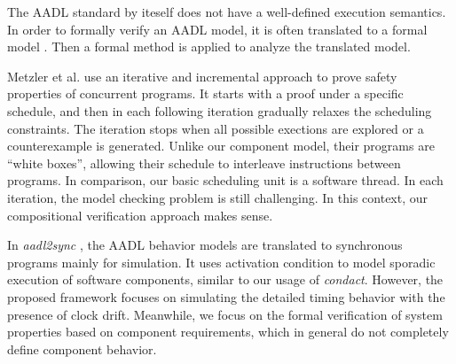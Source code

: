 The AADL standard by iteself does not have a well-defined execution semantics. In order to formally verify an AADL model, it is often translated to a formal model \cite{AADL2TASM} \cite{AADL2Sync} \cite{AADL2TLA} \cite{AADS} \cite{AADL2BIP}. Then a formal method is applied to analyze the translated model.

Metzler et al. \cite{Metzler2020} use an iterative and incremental approach to prove safety properties of concurrent programs. It starts with a proof under a specific schedule, and then in each following iteration gradually relaxes the scheduling constraints. The iteration stops when all possible exections are explored or a counterexample is generated. Unlike our component model, their programs are ``white boxes'', allowing their schedule to interleave instructions between programs. In comparison, our basic scheduling unit is a software thread. In each iteration, the model checking problem is still challenging. In this context, our compositional verification approach makes sense.

In \emph{aadl2sync} \cite{AADL2Sync}, the AADL behavior models are translated to synchronous programs mainly for simulation. It uses activation condition to model sporadic execution of software components, similar to our usage of \emph{condact}. However, the proposed framework focuses on simulating the detailed timing behavior with the presence of clock drift. Meanwhile, we focus on the formal verification of system properties based on component requirements, which in general do not completely define component behavior.

